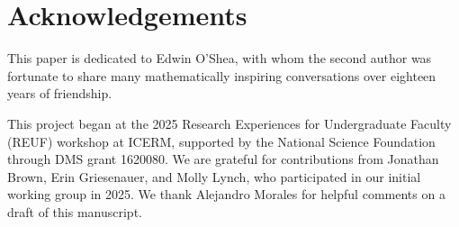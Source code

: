 \documentclass[11pt]{amsart}   %
\theoremstyle{definition}
\theoremstyle{remark}
\numberwithin{equation}{section}
\theoremstyle{theorem}
\begin{document}
\medskip
\section*{Acknowledgements}

This paper is dedicated to Edwin O'Shea, with whom the second author was
fortunate to share many mathematically inspiring conversations over eighteen
years of friendship.

\medskip
This project began at the 2025 Research Experiences for Undergraduate Faculty
(REUF) workshop at ICERM, supported by the National Science Foundation through
DMS grant 1620080.  We are grateful for contributions from Jonathan Brown, Erin
Griesenauer, and Molly Lynch, who participated in our initial working group in
2025.  We thank Alejandro Morales for helpful comments on a draft of this
manuscript.




\bigskip

%

\end{document}
